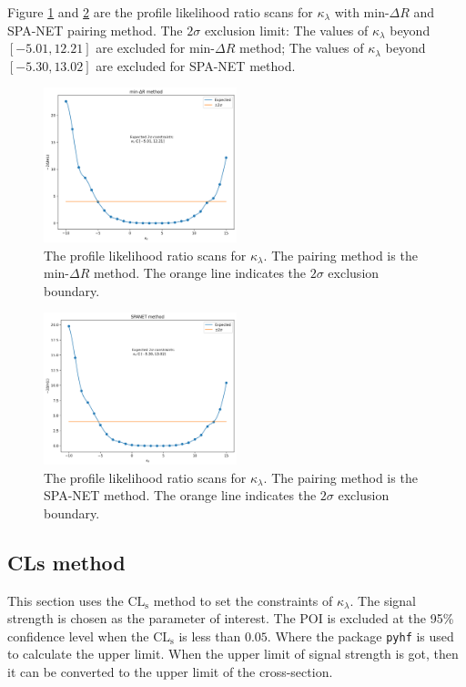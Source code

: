 \documentclass[12pt]{article}
\begin{document}
		Figure \ref{fig:log_likelihood_ratio_kappa_min_dR} and \ref{fig:log_likelihood_ratio_kappa_SPANET} are the profile likelihood ratio scans for $\kappa_\lambda$ with $\text{min-}\Delta R$ and SPA-NET pairing method. The $2\sigma$ exclusion limit: The values of $\kappa_\lambda$ beyond $\left[ -5.01,12.21 \right]$ are excluded for $\text{min-}\Delta R$ method; The values of $\kappa_\lambda$ beyond $\left[ -5.30, 13.02 \right]$ are excluded for SPA-NET method.
		\begin{figure}[htpb]
			\centering
			\includegraphics[width=0.5\textwidth]{log_likelihood_ratio_kappa_min_dR.png}
			\caption{The profile likelihood ratio scans for $\kappa_\lambda$. The pairing method is the $\text{min-}\Delta R$ method. The orange line indicates the $2\sigma$ exclusion boundary.}
			\label{fig:log_likelihood_ratio_kappa_min_dR}
		\end{figure}
		\begin{figure}[htpb]
			\centering
			\includegraphics[width=0.5\textwidth]{log_likelihood_ratio_kappa_SPANET.png}
			\caption{The profile likelihood ratio scans for $\kappa_\lambda$. The pairing method is the SPA-NET method. The orange line indicates the $2\sigma$ exclusion boundary.}
			\label{fig:log_likelihood_ratio_kappa_SPANET}
		\end{figure}
	\subsection{CLs method}%
	\label{sub:cls_method}
		This section uses the $\text{CL}_{\text{s}}$ method to set the constraints of $\kappa_\lambda$. The signal strength is chosen as the parameter of interest. The POI is excluded at the 95\% confidence level when the $\text{CL}_{\text{s}}$ is less than $0.05$. Where the package \verb+pyhf+ is used to calculate the upper limit. When the upper limit of signal strength is got, then it can be converted to the upper limit of the cross-section.
\end{document}
